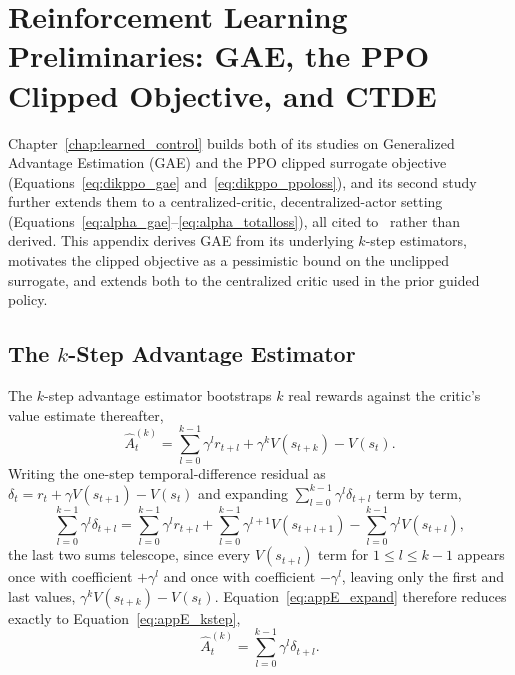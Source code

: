 \chapter{Reinforcement Learning Preliminaries: GAE, the PPO Clipped Objective, and CTDE}
\label{app:rl}

Chapter~\ref{chap:learned_control} builds both of its studies on Generalized Advantage Estimation
(GAE) and the PPO clipped surrogate objective (Equations~\eqref{eq:dikppo_gae}
and~\eqref{eq:dikppo_ppoloss}), and its second study further extends them to a centralized-critic,
decentralized-actor setting (Equations~\eqref{eq:alpha_gae}--\eqref{eq:alpha_totalloss}), all cited
to~\citep{schulman2017proximal,yu2022surprising} rather than derived. This appendix derives GAE from
its underlying $k$-step estimators, motivates the clipped objective as a pessimistic bound on the
unclipped surrogate, and extends both to the centralized critic used in the prior guided policy.

\section{The \texorpdfstring{$k$}{k}-Step Advantage Estimator}\label{sec:appE_kstep}

The $k$-step advantage estimator bootstraps $k$ real rewards against the critic's value estimate
thereafter,
\begin{equation}
\hat{A}_t^{(k)} = \sum_{l=0}^{k-1}\gamma^l r_{t+l} + \gamma^k V(s_{t+k}) - V(s_t).
\label{eq:appE_kstep}
\end{equation}
Writing the one-step temporal-difference residual as $\delta_t = r_t + \gamma V(s_{t+1}) - V(s_t)$
and expanding $\sum_{l=0}^{k-1}\gamma^l\delta_{t+l}$ term by term,
\begin{equation}
\sum_{l=0}^{k-1}\gamma^l\delta_{t+l} = \sum_{l=0}^{k-1}\gamma^l r_{t+l}
+ \sum_{l=0}^{k-1}\gamma^{l+1}V(s_{t+l+1}) - \sum_{l=0}^{k-1}\gamma^l V(s_{t+l}),
\label{eq:appE_expand}
\end{equation}
the last two sums telescope, since every $V(s_{t+l})$ term for $1\leq l\leq k-1$ appears once with
coefficient $+\gamma^l$ and once with coefficient $-\gamma^l$, leaving only the first and last
values, $\gamma^kV(s_{t+k}) - V(s_t)$. Equation~\eqref{eq:appE_expand} therefore reduces exactly to
Equation~\eqref{eq:appE_kstep},
\begin{equation}
\hat{A}_t^{(k)} = \sum_{l=0}^{k-1}\gamma^l\delta_{t+l}.
\label{eq:appE_kstepdelta}
\end{equation}


